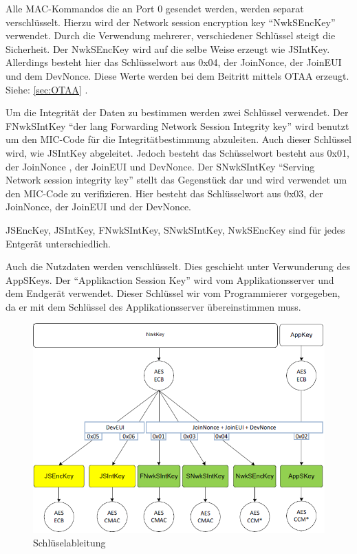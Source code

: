 \documentclass[a4paper, 12pt]{article}
\begin{document}
            Alle MAC-Kommandos die an Port 0 gesendet werden, werden separat verschlüsselt. 
            Hierzu wird der Network session encryption key ``NwkSEncKey'' verwendet. 
            Durch die Verwendung mehrerer, verschiedener Schlüssel steigt die Sicherheit. 
            Der NwkSEncKey wird auf die selbe Weise erzeugt wie JSIntKey. Allerdings besteht hier das Schlüsselwort 
            aus 0x04, der JoinNonce, der JoinEUI und dem DevNonce. Diese Werte werden bei dem Beitritt mittels OTAA 
            erzeugt. Siehe: \ref{sec:OTAA} .

            Um die Integrität der Daten zu bestimmen werden zwei Schlüssel verwendet. Der FNwkSIntKey ``der lang Forwarding 
            Network Session Integrity key'' wird benutzt um den MIC-Code für die Integritätbestimmung abzuleiten. Auch 
            dieser Schlüssel wird, wie JSIntKey abgeleitet. Jedoch besteht das Schüsselwort besteht aus 0x01, der JoinNonce , der 
            JoinEUI und DevNonce. Der SNwkSIntKey ``Serving Network session integrity key'' stellt das Gegenstück dar und 
            wird verwendet um den MIC-Code zu verifizieren. Hier besteht das Schlüsselwort aus 0x03, der 
            JoinNonce, der JoinEUI und der DevNonce.

            JSEncKey, JSIntKey, FNwkSIntKey, SNwkSIntKey, NwkSEncKey sind für jedes Entgerät unterschiedlich.

            Auch die Nutzdaten werden verschlüsselt. Dies geschieht unter Verwunderung des AppSKeys. 
            Der ``Applikaction Session Key'' wird vom Applikationsserver und dem Endgerät verwendet. 
            Dieser Schlüssel wir vom Programmierer vorgegeben, da er 
            mit dem Schlüssel des Applikationsserver übereinstimmen muss.\cite[S.50 ff]{LoRaSpec}
            \newpage
            \begin{figure}[ht]
                \centering
                \includegraphics[width=\textwidth]{Schluessel}
                \caption{Schlüselableitung \cite[S. 63]{LoRaSpec}}
            \end{figure}
\end{document}
